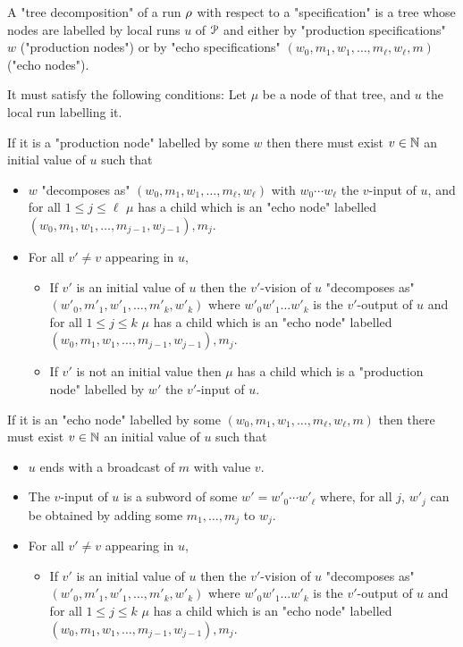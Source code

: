 \begin{definition}
	A "tree decomposition" of a run $\rho$ with respect to a "specification" is
	a tree whose nodes are labelled by local runs $u$ of $\mathcal{P}$ and either by "production specifications" $w$ ("production nodes") or by "echo specifications" $(w_0, m_1, w_1, \ldots, m_\ell, w_\ell, m)$ ("echo nodes"). 
	
	It must satisfy the following conditions:
	Let $\mu$ be a node of that tree, and $u$ the local run labelling it.
	
	If it is a "production node" labelled by some $w$ then there must exist $v \in \mathbb{N}$ an initial value of $u$ such that
	\begin{itemize}
		\item $w$ "decomposes as" $(w_0, m_1, w_1, \ldots, m_\ell, w_\ell)$ with $w_0 \cdots w_\ell$ the $v$-input of $u$, and for all $1 \leq j \leq \ell$ $\mu$ has a child which is an "echo node" labelled $(w_0, m_1, w_1, \ldots, m_{j-1}, w_{j-1}), m_j$.
		
		\item For all $v' \neq v$ appearing in $u$,
		\begin{itemize}
		\item If $v'$ is an initial value of $u$ then the $v'$-vision of $u$ "decomposes as"  $(w'_0, m'_1, w'_1, \ldots, m'_k, w'_k)$ where $w'_0 w'_1 \ldots w'_k$ is the $v'$-output of $u$ and for all $1 \leq j \leq k$ $\mu$ has a child which is an "echo node" labelled $(w_0, m_1, w_1, \ldots, m_{j-1}, w_{j-1}), m_j$.  
			
		\item If $v'$ is not an initial value then $\mu$ has a child which is a "production node" labelled by $w'$ the $v'$-input of $u$.
		\end{itemize}
	\end{itemize}

	If it is an "echo node" labelled by some $(w_0, m_1, w_1, \ldots, m_\ell, w_\ell, m)$ then there must exist $v \in \mathbb{N}$ an initial value of $u$ such that
	\begin{itemize}
		\item $u$ ends with a broadcast of $m$ with value $v$.
		
		\item The $v$-input of $u$ is a subword of some $w' = w'_0\cdots w'_\ell$ where, for all $j$, $w'_j$ can be obtained by adding some $m_1, \ldots, m_{j}$ to $w_j$.
		
		\item For all $v' \neq v$ appearing in $u$,
		\begin{itemize}
			\item If $v'$ is an initial value of $u$ then the $v'$-vision of $u$ "decomposes as"  $(w'_0, m'_1, w'_1, \ldots, m'_k, w'_k)$ where $w'_0 w'_1 \ldots w'_k$ is the $v'$-output of $u$ and for all $1 \leq j \leq k$ $\mu$ has a child which is an "echo node" labelled $(w_0, m_1, w_1, \ldots, m_{j-1}, w_{j-1}), m_j$.  
			

\end{itemize}
\end{itemize}
\end{definition}

